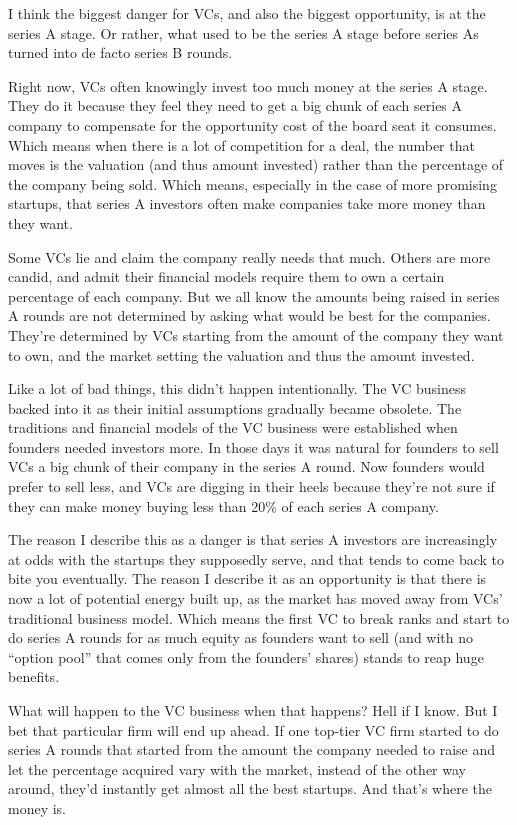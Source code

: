 \documentclass[12pt]{book}
\begin{document}
I think the biggest danger for VCs, and also the biggest opportunity, is
at the series A stage. Or rather, what used to be the series A stage
before series As turned into de facto series B rounds.

Right now, VCs often knowingly invest too much money at the series A
stage. They do it because they feel they need to get a big chunk of each
series A company to compensate for the opportunity cost of the board
seat it consumes. Which means when there is a lot of competition for a
deal, the number that moves is the valuation (and thus amount invested)
rather than the percentage of the company being sold. Which means,
especially in the case of more promising startups, that series A
investors often make companies take more money than they want.

Some VCs lie and claim the company really needs that much. Others are
more candid, and admit their financial models require them to own a
certain percentage of each company. But we all know the amounts being
raised in series A rounds are not determined by asking what would be
best for the companies. They're determined by VCs starting from the
amount of the company they want to own, and the market setting the
valuation and thus the amount invested.

Like a lot of bad things, this didn't happen intentionally. The VC
business backed into it as their initial assumptions gradually became
obsolete. The traditions and financial models of the VC business were
established when founders needed investors more. In those days it was
natural for founders to sell VCs a big chunk of their company in the
series A round. Now founders would prefer to sell less, and VCs are
digging in their heels because they're not sure if they can make money
buying less than 20\% of each series A company.

The reason I describe this as a danger is that series A investors are
increasingly at odds with the startups they supposedly serve, and that
tends to come back to bite you eventually. The reason I describe it as
an opportunity is that there is now a lot of potential energy built up,
as the market has moved away from VCs' traditional business model. Which
means the first VC to break ranks and start to do series A rounds for as
much equity as founders want to sell (and with no ``option pool'' that
comes only from the founders' shares) stands to reap huge benefits.

What will happen to the VC business when that happens? Hell if I know.
But I bet that particular firm will end up ahead. If one top-tier VC
firm started to do series A rounds that started from the amount the
company needed to raise and let the percentage acquired vary with the
market, instead of the other way around, they'd instantly get almost all
the best startups. And that's where the money is.
\end{document}
